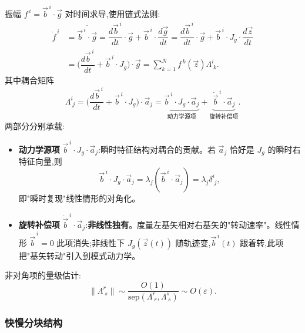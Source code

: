 \documentclass[11pt,a4paper]{article}
\newcommand{\Jg}{J_{\!g}}
\newcommand{\diff}[2]{\dfrac{d #1}{d #2}}
\begin{document}
振幅 $f^{\,i}=\vec b^{\,i}\cdot\vec g$ 对时间求导,使用链式法则:
\begin{align}
\dot f^{\,i}&=\overline{\vec b^{\,i}\cdot\vec g}=\diff{\vec b^{\,i}}{t}\cdot\vec g+\vec b^{\,i}\cdot\diff{\vec g}{t}=\diff{\vec b^{\,i}}{t}\cdot\vec g+\vec b^{\,i}\cdot\Jg\cdot\diff{\vec z}{t}\nonumber\\
&=\Big(\diff{\vec b^{\,i}}{t}+\vec b^{\,i}\cdot\Jg\Big)\cdot\vec g=\sum_{k=1}^{N}f^{\,k}(\vec z)\Lambda^{i}_{\;k}.
\end{align}
其中耦合矩阵
\begin{equation}
\Lambda^{i}_{\;j}=\Big(\diff{\vec b^{\,i}}{t}+\vec b^{\,i}\cdot\Jg\Big)\cdot \vec a_j=\underbrace{\vec b^{\,i}\cdot\Jg\cdot\vec a_j}_{\text{动力学源项}}+\underbrace{\dot{\vec b}^{\,i}\cdot\vec a_j}_{\text{旋转补偿项}}.
\end{equation}
两部分分别承载:
\begin{itemize}[leftmargin=2em]
\item \textbf{动力学源项} $\vec b^{\,i}\cdot\Jg\cdot\vec a_j$:瞬时特征结构对耦合的贡献。若 $\vec a_j$ 恰好是 $\Jg$ 的瞬时右特征向量,则
\begin{equation}
\vec b^{\,i}\cdot\Jg\cdot\vec a_j=\lambda_j(\vec b^{\,i}\cdot\vec a_j)=\lambda_j\delta^{i}_{\;j},
\end{equation}
即"瞬时复现"线性情形的对角化。
\item \textbf{旋转补偿项} $\dot{\vec b}^{\,i}\cdot\vec a_j$:\textbf{非线性独有}。度量左基矢相对右基矢的"转动速率"。线性情形 $\dot{\vec b}^{\,i}=0$ 此项消失;非线性下 $\Jg(\vec z(t))$ 随轨迹变,$\vec b^{\,i}(t)$ 跟着转,此项把"基矢转动"引入到模式动力学。
\end{itemize}
非对角项的量级估计:
\begin{equation}
\|\Lambda^{r}_{\;s}\|\sim\frac{O(1)}{\mathrm{sep}(\Lambda^{r}_{\;r},\Lambda^{s}_{\;s})}\sim O(\varepsilon).
\end{equation}

\subsubsection*{快慢分块结构}
\end{document}
